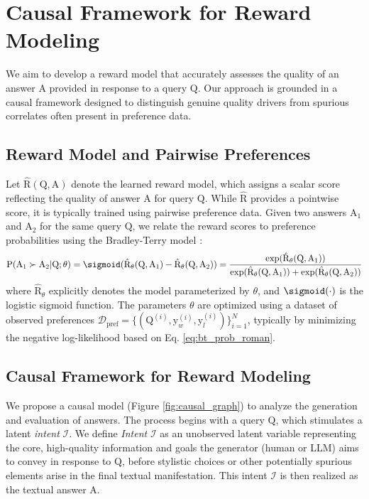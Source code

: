 \section{Causal Framework for Reward Modeling}
\label{sec:preliminaries}

We aim to develop a reward model that accurately assesses the quality of an answer $\mathrm{A}$ provided in response to a query $\mathrm{Q}$. Our approach is grounded in a causal framework designed to distinguish genuine quality drivers from spurious correlates often present in preference data.

\subsection{Reward Model and Pairwise Preferences}
Let $\hat{\mathrm{R}}(\mathrm{Q}, \mathrm{A})$ denote the learned reward model, which assigns a scalar score reflecting the quality of answer $\mathrm{A}$ for query $\mathrm{Q}$. While $\hat{\mathrm{R}}$ provides a pointwise score, it is typically trained using pairwise preference data. Given two answers $\mathrm{A}_1$ and $\mathrm{A}_2$ for the same query $\mathrm{Q}$, we relate the reward scores to preference probabilities using the Bradley-Terry model \citep{bradley1952rank}:
\begin{equation}
\mathrm{P}(\mathrm{A}_1 \succ \mathrm{A}_2 | \mathrm{Q}; \theta) = \sigmoid(\hat{\mathrm{R}}_\theta(\mathrm{Q}, \mathrm{A}_1) - \hat{\mathrm{R}}_\theta(\mathrm{Q}, \mathrm{A}_2)) = \frac{\exp(\hat{\mathrm{R}}_\theta(\mathrm{Q}, \mathrm{A}_1))}{\exp(\hat{\mathrm{R}}_\theta(\mathrm{Q}, \mathrm{A}_1)) + \exp(\hat{\mathrm{R}}_\theta(\mathrm{Q}, \mathrm{A}_2))}
\label{eq:bt_prob_roman}
\end{equation}
where $\hat{\mathrm{R}}_\theta$ explicitly denotes the model parameterized by $\theta$, and $\sigmoid(\cdot)$ is the logistic sigmoid function. The parameters $\theta$ are optimized using a dataset of observed preferences $\mathcal{D}_{\mathrm{pref}} = \{(\mathrm{Q}^{(i)}, \mathrm{y}_w^{(i)}, \mathrm{y}_l^{(i)})\}_{i=1}^N$, typically by minimizing the negative log-likelihood based on Eq. \ref{eq:bt_prob_roman}.

\subsection{Causal Framework for Reward Modeling}
\label{subsec:causal_graph}

We propose a causal model (Figure \ref{fig:causal_graph}) to analyze the generation and evaluation of answers. The process begins with a query $\mathrm{Q}$, which stimulates a latent \textit{intent} $\mathcal{I}$. We define \textit{Intent} $\mathcal{I}$ as an unobserved latent variable representing the core, high-quality information and goals the generator (human or LLM) aims to convey in response to $\mathrm{Q}$, before stylistic choices or other potentially spurious elements arise in the final textual manifestation. This intent $\mathcal{I}$ is then realized as the textual answer $\mathrm{A}$.


